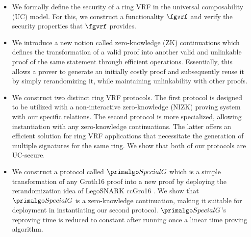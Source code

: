  \begin{itemize}
 	\item We formally define the security of a ring VRF in the universal composability (UC) model. For this, we construct a functionality $ \fgvrf $ and verify the security properties that $ \fgvrf $ provides.
 	
 	\item We introduce a new notion called zero-knowledge (ZK) continuations  which defines the transformation of a valid proof into another valid and unlinkable proof of the same statement through efficient operations. Essentially, this allows a prover to generate an initially costly proof and subsequently reuse it by simply rerandomizing it,  while maintaining unlinkability with other proofs. 
 	
 	\item We construct two distinct  ring VRF protocols. The first protocol is designed to be utilized with a non-interactive zero-knowledge (NIZK) proving system with our specific relations. The second protocol is more specialized, allowing instantiation with any zero-knowledge continuations. The latter offers an efficient solution for ring VRF applications that necessitate the generation of multiple signatures for the same ring. We show that both of our protocols are UC-secure.
 	
 	\item 	We construct a protocol called $ \SpecialG $  which  is a simple transformation of any Groth16 proof into a new proof by deploying the rerandomization idea of LegoSNARK ccGro16 \cite{LegoSNARK}. We show that $ \SpecialG $ is a zero-knowledge continuation, making it suitable for deployment in instantiating our second protocol. $ \SpecialG $'s reproving time is reduced to constant after running once a linear time proving algorithm.
 	 
  
 \end{itemize}
